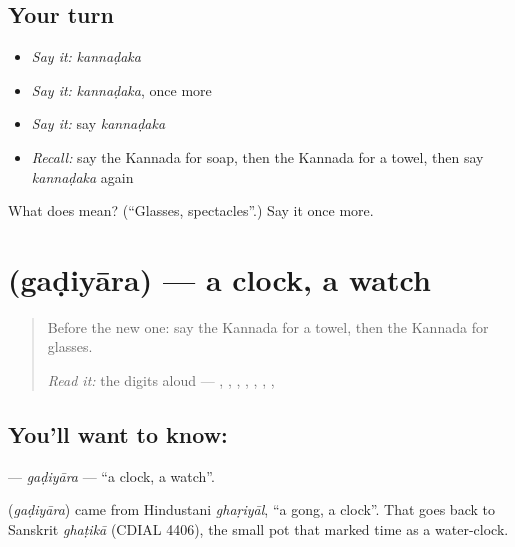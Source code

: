 \subsection*{Your turn}
\begin{itemize}
\raggedright
  \item \emph{Say it:} \emph{kannaḍaka}
  \item \emph{Say it:} \emph{kannaḍaka}, once more
  \item \emph{Say it:} say \emph{kannaḍaka}
  \item \emph{Recall:} say the Kannada for soap, then the Kannada for a towel, then say \emph{kannaḍaka} again
\end{itemize}

\begin{tcolorbox}[breakable,colback=teal!4,colframe=teal!35!black,title={Before you move on}]
What does  mean? (\textquotedblleft{}Glasses, spectacles\textquotedblright{}.) Say it once more.
\end{tcolorbox}
\section[\texorpdfstring{\kn{ಗಡಿಯಾರ} (gaḍiyāra)}{ಗಡಿಯಾರ (gaḍiyāra)}]{ (gaḍiyāra) — a clock, a watch}

\label{lesson:KA-C118-gadiyara}



\begin{quote}
Before the new one: say the Kannada for a towel, then the Kannada for glasses.

\emph{Read it:} the digits aloud — \textbf{}, \textbf{}, \textbf{}, \textbf{}, \textbf{}, \textbf{}, \textbf{}, \textbf{}
\end{quote}

\subsection*{You'll want to know: }
\textbf{} — \emph{gaḍiyāra} — \textquotedblleft{}a clock, a watch\textquotedblright{}.

\begin{cousinweb}
\textbf{} (\emph{gaḍiyāra}) came from Hindustani \emph{ghaṛiyāl}, \textquotedblleft{}a gong, a clock\textquotedblright{}. That goes back to Sanskrit \emph{ghaṭikā} (CDIAL 4406), the small pot that marked time as a water-clock.
\end{cousinweb}

